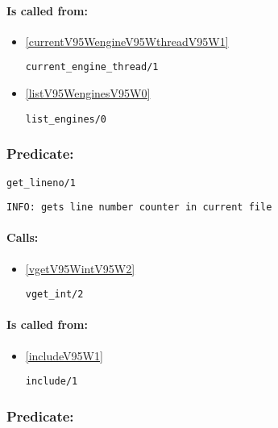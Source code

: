 \paragraph{Is called from:} 
\begin{itemize}
\item \ref{currentV95WengineV95WthreadV95W1} 
\begin{verbatim}
current_engine_thread/1
\end{verbatim}

\item \ref{listV95WenginesV95W0} 
\begin{verbatim}
list_engines/0
\end{verbatim}

\end{itemize}

\subsubsection{Predicate:} \label{getV95WlinenoV95W1}

\begin{verbatim}
get_lineno/1
\end{verbatim}

{\small \begin{verbatim}
INFO: gets line number counter in current file

\end{verbatim}}
\paragraph{Calls:} 
\begin{itemize}
\item \ref{vgetV95WintV95W2} 
\begin{verbatim}
vget_int/2
\end{verbatim}

\end{itemize}
\paragraph{Is called from:} 
\begin{itemize}
\item \ref{includeV95W1} 
\begin{verbatim}
include/1
\end{verbatim}

\end{itemize}

\subsubsection{Predicate:} \label{getV95WloadV95WmethodV95W1}

